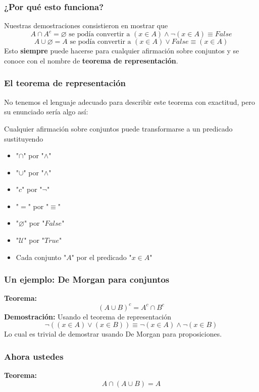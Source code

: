 \documentclass{beamer}
\begin{document}
\begin{frame}[fragile]
    \frametitle{¿Por qué esto funciona?}
    Nuestras demostraciones consistieron en mostrar que
    $$A \cap A^c = \varnothing \text{ se podía convertir a } (x \in A) \land \lnot (x \in A) \equiv False$$
    $$A \cup \varnothing = A \text{ se podía convertir a } (x \in A) \lor False \equiv (x \in A)$$
    Esto \textbf{siempre} puede hacerse para cualquier afirmación sobre conjuntos y se conoce con el nombre de \textbf{teorema de representación}.
\end{frame}

\begin{frame}[fragile]
    \frametitle{El teorema de representación}
    No tenemos el lenguaje adecuado para describir este teorema con exactitud,
    pero su enunciado sería algo así:

    \begin{center}
        Cualquier afirmación sobre conjuntos puede transformarse a un predicado sustituyendo
        \begin{itemize}
            \item "$\cap$" por "$\land$"
            \item "$\cup$" por "$\land$"
            \item "$c$" por "$\lnot$"
            \item "$=$" por "$\equiv$"
            \item "$\varnothing$" por "$False$"
            \item "$\mathcal{U}$" por "$True$"
            \item Cada conjunto "$A$" por el predicado "$x \in A$"
        \end{itemize}
    \end{center}
\end{frame}

\begin{frame}[fragile]
    \frametitle{Un ejemplo: De Morgan para conjuntos}
    \textbf{Teorema:}
    $$(A \cup B)^c = A^c \cap B^c$$
    \textbf{Demostración:}
    Usando el teorema de representación
    $$\lnot((x \in A) \lor (x \in B)) \equiv \lnot(x \in A) \land \lnot(x \in B)$$
    Lo cual es trivial de demostrar usando De Morgan para proposiciones.
\end{frame}

\begin{frame}[fragile]
    \frametitle{Ahora ustedes}
    \textbf{Teorema:}
    $$A \cap (A \cup B) = A$$
    \vspace{165pt}
\end{frame}
\end{document}
